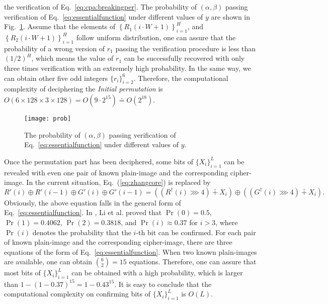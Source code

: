 \documentclass{ws-ijbc}
\newlength\singleimagewidth
\newlength\imagewidth
\begin{document}
the verification of Eq.~\eqref{eq:cpa:breakingper}.
The probability of $(\alpha, \beta)$ passing verification of
Eq.~\eqref{eq:essentialfunction} under different values of $y$ are shown
in Fig.~\ref{fig:prob}. Assume that the elements of $\left\{R_1(i\cdot W+1)\right\}_{i=1}^{H}$,
and $\left\{R_2(i\cdot W+1)\right\}_{i=1}^{H}$ follow uniform distribution,
one can assure that the probability of a wrong version of $r_1$ passing
the verification procedure is less than ${(1/2)}^{H}$, which means
the value of $r_1$ can be successfully recovered with only three times verification with an extremely high probability.
In the same way, we can obtain other five odd integers $\{r_i\}_{i=2}^{6}$.
Therefore, the computational complexity of deciphering the \textit{Initial permutation}
is $O(6 \times 128\times 3\times 128) = O(9\cdot 2^{15})\doteq O(2^{18})$.
\begin{figure}[!htb]
\centering
\texttt{[image: prob]}
\caption{The probability of $(\alpha, \beta)$ passing verification
of Eq.~\eqref{eq:essentialfunction} under different values of $y$.}
\label{fig:prob}
\end{figure}

Once the permutation part has been deciphered,
some bits of $\{X_{i}\}_{i=1}^{L}$ can be revealed with
even one pair of known plain-image and the corresponding cipher-image.
In the current situation, Eq.~(\ref{eq:zhangcore}) is replaced by
\begin{equation*}
\label{eq:essentialfunction:rg}
R'(i) \oplus R'(i-1) \oplus G'(i) \oplus G'(i-1) =
 \left(\left(R^{\dagger}(i)\ggg 4\right) \dotplus X_{i}\right)
 \oplus \left(\left(G^{\dagger}(i)\ggg 4\right) \dotplus X_{i}\right).
\end{equation*}
Obviously, the above equation falls in the general form of Eq.~\eqref{eq:essentialfunction}.
In \cite[Sec.~3.2]{Cqli:breakmodulo:IJBC13}, Li et al. proved that $\Pr(0) = 0.5$, $\Pr(1) = 0.4062$, $\Pr(2) = 0.3818$, and
$\Pr(i) \approx 0.37$ for $i > 3$, where $\Pr(i)$ denotes the probability that the $i$-th bit can be confirmed.
For each pair of known plain-image and the corresponding cipher-image, there are three equations of the form of Eq.~\eqref{eq:essentialfunction}.
\iffalse Due to the inherent relations among the three equations, it is very hard to estimate
the probability that $\{X_{i}\}_{i=1}^{L}$ can be confirmed.\fi When two known
plain-images are available, one can obtain ${6 \choose 2} = 15$ equations.
Therefore, one can assure that most bits of $\{X_{i}\}_{i=1}^{L}$ can be obtained with a high probability, which is larger
than $1-(1-0.37)^{15}=1-0.43^{15}$. It is easy to conclude that the computational complexity on confirming bits of $\{X_{i}\}_{i=1}^{L}$ is $O(L)$.
\end{document}
